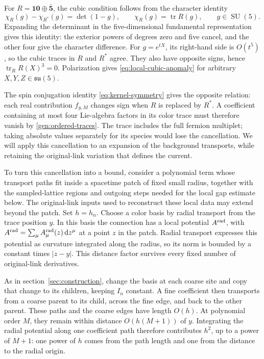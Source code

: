 \documentclass[11pt,a4paper]{article}
\theoremstyle{remark}
\DeclareMathOperator{\tr}{tr}
\DeclareMathOperator{\SU}{SU}
\newcommand{\dd}{\mathrm d}
\begin{document}
For $R=\mathbf{10}\oplus\bar{\mathbf5}$, the cubic condition follows
from the character identity
\begin{equation}
 \chi_R(g)-\chi_{R^*}(g)=\det(1-g),\qquad
 \chi_R(g)=\tr R(g),\qquad g\in\SU(5).
 \label{eq:character}
\end{equation}
Expanding the determinant in the five-dimensional fundamental
representation gives this identity: the exterior powers of degrees
zero and five cancel, and the other four give the character difference.
For $g=e^{tX}$, its right-hand side is $O(t^5)$, so the cubic traces
in $R$ and $R^*$ agree. They also have opposite signs, hence
$\tr_R R(X)^3=0$. Polarization gives
\eqref{eq:local-cubic-anomaly} for arbitrary $X,Y,Z\in\mathfrak{su}(5)$.

The spin conjugation identity \eqref{eq:kernel-symmetry} gives the
opposite relation: each real contribution $f_{y,M}$ changes sign when
$R$ is replaced by $R^*$. A coefficient containing at most four
Lie-algebra factors in its color trace must therefore vanish by
\eqref{gen:ordered-traces}. The trace includes the full fermion multiplet;
taking absolute values separately for its species would lose the
cancellation. We will
apply this cancellation to an expansion of the background transports,
while retaining the original-link variation that defines the current.

To turn this cancellation into a bound, consider a polynomial term whose
transport paths fit inside a spacetime patch of fixed small radius,
together with the sampled-lattice regions and outgoing steps needed for
the local gap estimate below. The original-link inputs used to reconstruct
these local data may extend beyond the patch. Set $h=h_n$.
Choose a color basis by radial transport from the trace position $y$.
In this basis the connection has a local potential $A^{\rm rad}$, with
$A^{\rm rad}=\sum_\mu A_\mu^{\rm rad}(z)\,\dd z^\mu$ at a point
$z$ in the patch. Radial transport expresses this potential as curvature
integrated along the radius, so its norm is bounded by a constant times
$|z-y|$. This distance factor survives every fixed number of
original-link derivatives.

As in section~\ref{sec:construction}, change the basis at each coarse
site and copy that change to its children, keeping $I_n$ constant.
A fine coefficient then transports from a coarse parent to its child,
across the fine edge, and back to the other parent. These paths and
the coarse edges have length $O(h)$. At polynomial order $M$, they
remain within distance $O(h(M+1))$ of $y$. Integrating the radial
potential along one coefficient path therefore contributes $h^2$,
up to a power of $M+1$: one power of $h$ comes from the path length
and one from the distance to the radial origin.
\end{document}

